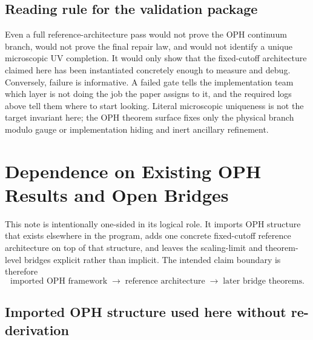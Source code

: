 \documentclass[11pt]{article}
\begin{document}
\subsection{Reading rule for the validation package}

Even a full reference-architecture pass would not prove the OPH continuum branch, would
not prove the final repair law, and would not identify a unique microscopic UV completion. It would only
show that the fixed-cutoff architecture claimed here has been instantiated concretely
enough to measure and debug. Conversely, failure is informative. A failed gate tells the
implementation team which layer is not doing the job the paper assigns to it, and the required
logs above tell them where to start looking. Literal microscopic uniqueness is not the target
invariant here; the OPH theorem surface fixes only the physical branch modulo gauge or
implementation hiding and inert ancillary refinement.

\section{Dependence on Existing OPH Results and Open Bridges}

This note is intentionally one-sided in its logical role. It imports OPH structure that
exists elsewhere in the program, adds one concrete fixed-cutoff reference architecture on top of
that structure, and leaves the scaling-limit and theorem-level bridges explicit rather than
implicit. The intended claim boundary is therefore
\begin{equation}
\text{imported OPH framework}
\;\longrightarrow\;
\text{reference architecture}
\;\longrightarrow\;
\text{later bridge theorems}.
\end{equation}

\subsection{Imported OPH structure used here without re-derivation}
\end{document}
